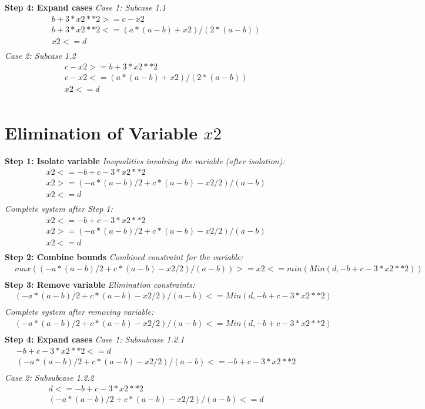 \documentclass{article}
\begin{document}
\textbf{Step 4: Expand cases}
\textit{Case 1: Subcase 1.1}
\begin{align}
& b + 3*x2**2 >= c - x2 \\
& b + 3*x2**2 <= (a*(a - b) + x2)/(2*(a - b)) \\
& x2 <= d \\
\end{align}
\textit{Case 2: Subcase 1.2}
\begin{align}
& c - x2 >= b + 3*x2**2 \\
& c - x2 <= (a*(a - b) + x2)/(2*(a - b)) \\
& x2 <= d \\
\end{align}

\newpage
\section{Elimination of Variable $x2$}

\textbf{Step 1: Isolate variable}
\textit{Inequalities involving the variable (after isolation):}
\begin{align}
& x2 <= -b + c - 3*x2**2 \\
& x2 >= (-a*(a - b)/2 + c*(a - b) - x2/2)/(a - b) \\
& x2 <= d \\
\end{align}
\textit{Complete system after Step 1:}
\begin{align}
& x2 <= -b + c - 3*x2**2 \\
& x2 >= (-a*(a - b)/2 + c*(a - b) - x2/2)/(a - b) \\
& x2 <= d \\
\end{align}
\textbf{Step 2: Combine bounds}
\textit{Combined constraint for the variable:}
\begin{align}
& max((-a*(a - b)/2 + c*(a - b) - x2/2)/(a - b)) >= x2 <= min(Min(d, -b + c - 3*x2**2)) \\
\end{align}
\textbf{Step 3: Remove variable}
\textit{Elimination constraints:}
\begin{align}
& (-a*(a - b)/2 + c*(a - b) - x2/2)/(a - b) <= Min(d, -b + c - 3*x2**2) \\
\end{align}
\textit{Complete system after removing variable:}
\begin{align}
& (-a*(a - b)/2 + c*(a - b) - x2/2)/(a - b) <= Min(d, -b + c - 3*x2**2) \\
\end{align}
\textbf{Step 4: Expand cases}
\textit{Case 1: Subsubcase 1.2.1}
\begin{align}
& -b + c - 3*x2**2 <= d \\
& (-a*(a - b)/2 + c*(a - b) - x2/2)/(a - b) <= -b + c - 3*x2**2 \\
\end{align}
\textit{Case 2: Subsubcase 1.2.2}
\begin{align}
& d <= -b + c - 3*x2**2 \\
& (-a*(a - b)/2 + c*(a - b) - x2/2)/(a - b) <= d \\
\end{align}

\newpage
\end{document}
